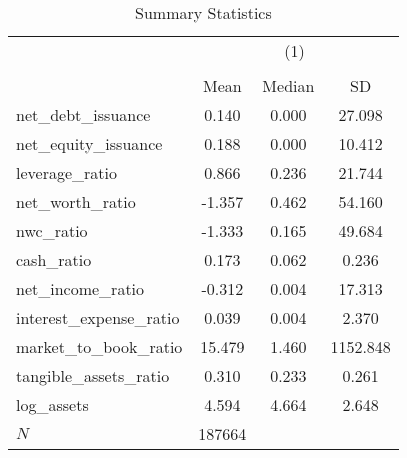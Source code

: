 \begin{table}[htbp]\centering
\def\sym#1{\ifmmode^{#1}\else\(^{#1}\)\fi}
\caption{Summary Statistics}
\begin{tabular}{l*{1}{ccc}}
\hline\hline
            &\multicolumn{3}{c}{(1)}               \\
            &\multicolumn{3}{c}{}                  \\
            &        Mean&      Median&          SD\\
\hline
net\_debt\_issuance&       0.140&       0.000&      27.098\\
net\_equity\_issuance&       0.188&       0.000&      10.412\\
leverage\_ratio&       0.866&       0.236&      21.744\\
net\_worth\_ratio&      -1.357&       0.462&      54.160\\
nwc\_ratio   &      -1.333&       0.165&      49.684\\
cash\_ratio  &       0.173&       0.062&       0.236\\
net\_income\_ratio&      -0.312&       0.004&      17.313\\
interest\_expense\_ratio&       0.039&       0.004&       2.370\\
market\_to\_book\_ratio&      15.479&       1.460&    1152.848\\
tangible\_assets\_ratio&       0.310&       0.233&       0.261\\
log\_assets  &       4.594&       4.664&       2.648\\
\hline
\(N\)       &      187664&            &            \\
\hline\hline
\end{tabular}
\end{table}
